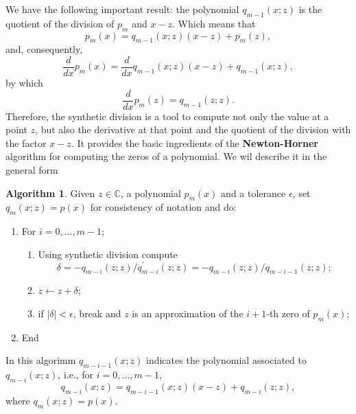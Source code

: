 \documentclass[10pt,a4paper]{article}
\theoremstyle{definition}%
\newtheorem{algo}{Algorithm}
\begin{document}
We have the following important result: the polynomial $q_{m-1}(x;z)$ is the quotient of the division of $p_m$ and $x-z$. Which means that 
\begin{equation}
\label{eq:quotient}
\boxed{p_m(x)=q_{m-1}(x;z)(x-z) + p_m(z),}
\end{equation}
and, consequently,
\begin{equation}
\label{eq:quotientder}
\boxed{\frac{d}{dx}p_m(x)=\frac{d}{dx}q_{m-1}(x;z)(x-z) + q_{m-1}(x;z),}
\end{equation}
by which
\begin{equation}
\label{eq:quotientder}
\boxed{\frac{d}{dx}p_m(z)=q_{m-1}(z;z).}
\end{equation}
Therefore, the synthetic division is a tool to compute not only the value at a point $z$, but also the derivative at that point and the quotient of the division with the factor $x-z$. It provides the basic ingredients of the \textbf{Newton-Horner} algorithm for computing the zeros of a polynomial. We wil describe it in the general form
\begin{algo}
    Given $z\in\mathbb{C}$, a polynomial $p_m(x)$ and a tolerance $\epsilon$, 
    set $q_m(x;z)=p(x)$ for consistency of notation and do:
    \begin{enumerate}
        \item For $i=0,\ldots,m-1$;
        \begin{enumerate}
            \item Using synthetic division compute 
            \[
            \delta=-q_{m-i}(z;z)/q_{m-i}^\prime(z;z)= -q_{m-i}(z;z)/q_{m-i-1}(z;z);
            \]
            \item $z \leftarrow z+\delta$;
            \item if $\vert\delta\vert<\epsilon$, break and $z$ is an approximation of the $i+1$-th zero of $p_m(x)$; 
        \end{enumerate}
    \item End
    \end{enumerate}
In this algorimm $q_{m-i-1}(x;z)$ indicates the polynomial associated to $q_{m-i}(x;z)$, i.e., for $i=0,\ldots, m-1$,
\begin{equation}
\label{eq:associatedgen}
\boxed{q_{m-i}(x;z)=q_{m-i-1}(x;z)(x-z)+q_{m-i}(z;z),}
\end{equation}
where $q_m(x;z)=p(x)$.
\end{algo}
\end{document}
